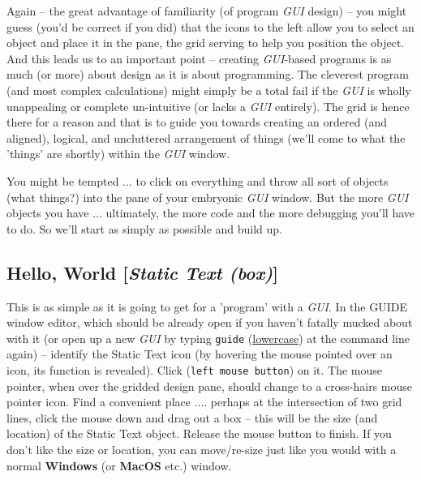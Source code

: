 \documentclass{tufte-book} %
\begin{document}
Again -- the great advantage of familiarity (of program \textit{GUI} design) -- you might guess (you'd be correct if you did) that the icons to the left allow you to select an object and place it in the pane, the grid serving to help you position the object. And this leads us to an important point -- creating \textit{GUI}-based programs is as much (or more) about design as it is about programming. The cleverest program (and most complex calculations) might simply be a total fail if the \textit{GUI} is wholly unappealing or complete un-intuitive (or lacks a \textit{GUI} entirely). The grid is hence there for a reason and that is to guide you towards creating an ordered (and aligned), logical, and uncluttered arrangement of things (we'll come to what the 'things' are shortly) within the \textit{GUI} window.

You might be tempted ... to click on everything and throw all sort of objects (what things?) into the pane of your embryonic \textit{GUI} window. But the more \textit{GUI} objects you have ... ultimately, the more code and the more debugging you'll have to do. So we'll start as simply as possible and build up. 


\subsection{Hello, World [\textit{Static Text (box)}]}

This is as simple as it is going to get for a 'program' with a \textit{GUI}. In the \textsf{GUIDE window editor}, which should be already open if you haven't fatally mucked about with it (or open up a new \textit{GUI} by typing \texttt{guide} (\uline{lowercase}) at the command line again) -- identify the \textsf{Static Text} icon (by hovering the mouse pointed over an icon, its function is revealed). Click (\texttt{left mouse button}) on it. The mouse pointer, when over the gridded design pane, should change to a cross-hairs mouse pointer icon. Find a convenient place .... perhaps at the intersection of two grid lines, click the mouse down and drag out a box -- this will be the size (and location) of the \textsf{Static Text} object. Release the mouse button to finish. If you don't like the size or location, you can move/re-size just like you would with a normal \textbf{Windows} (or \textbf{MacOS} etc.) window.
\end{document}

